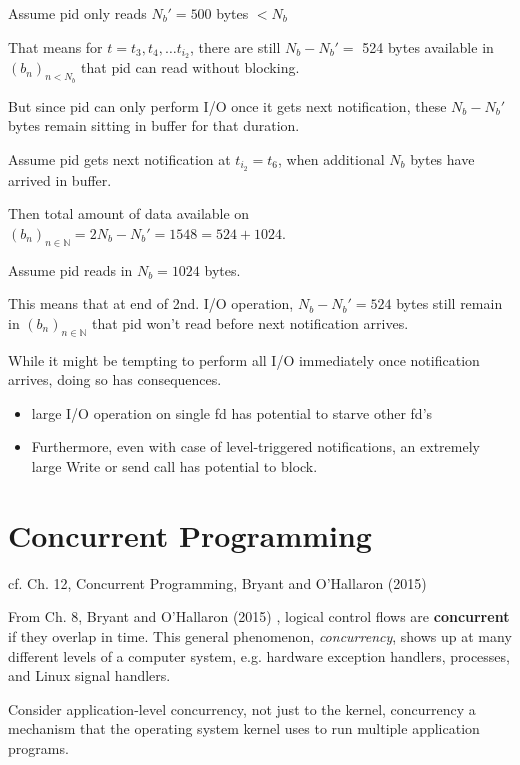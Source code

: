 \documentclass[10pt]{amsart}
\begin{document}
\begin{multicols*}{2}
Assume pid only reads $N_b' = 500$ bytes $<N_b$

That means for $t=t_3, t_4, \dots t_{i_2}$, there are still $N_b - N_b' = $ 524 bytes available in $(b_n)_{n < N_b}$ that pid can read without blocking.

But since pid can only perform I/O once it gets next notification, these $N_b - N_b'$ bytes remain sitting in buffer for that duration.

Assume pid gets next notification at $t_{i_2} = t_6$, when additional $N_b$ bytes have arrived in buffer.

Then total amount of data available on $(b_n)_{n\in \mathbb{N}} = 2N_b - N_b' = 1548 = 524 + 1024$.

Assume pid reads in $N_b = 1024$ bytes.

This means that at end of 2nd. I/O operation, $N_b - N_b' = 524$ bytes still remain in $(b_n)_{n\in \mathbb{N}}$ that pid won't read before next notification arrives.

While it might be tempting to perform all I/O immediately once notification arrives, doing so has consequences. 
\begin{itemize}
	\item large I/O operation on single fd has potential to starve other fd's 
	\item Furthermore, even with case of level-triggered notifications, an extremely large Write or send call has potential to block.
\end{itemize}

\section{Concurrent Programming}

cf. Ch. 12, Concurrent Programming, Bryant and O'Hallaron (2015) \cite{BrOH2016}

From Ch. 8, Bryant and O'Hallaron (2015) \cite{BrOH2016}, logical control flows are \textbf{concurrent} if they overlap in time. This general phenomenon, \emph{concurrency}, shows up at many different levels of a computer system, e.g. hardware exception handlers, processes, and Linux signal handlers.

Consider application-level concurrency, not just to the kernel, concurrency a mechanism that the operating system kernel uses to run multiple application programs.


\end{multicols*}
\end{document}

